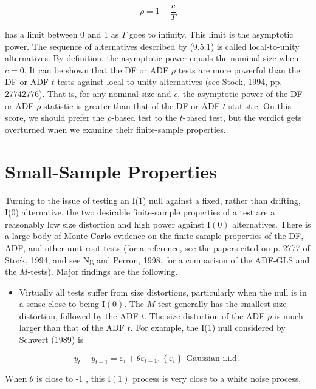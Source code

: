 \documentclass[10pt]{article}
\begin{document}
\begin{equation*}
\rho=1+\frac{c}{T} \tag{9.5.1}
\end{equation*}


has a limit between 0 and 1 as $T$ goes to infinity. This limit is the asymptotic power. The sequence of alternatives described by (9.5.1) is called local-to-unity alternatives. By definition, the asymptotic power equals the nominal size when $c=0$. It can be shown that the DF or ADF $\rho$ tests are more powerful than the DF or ADF $t$ tests against local-to-unity alternatives (see Stock, 1994, pp. 27742776). That is, for any nominal size and $c$, the asymptotic power of the DF or ADF $\rho$ statistic is greater than that of the DF or ADF $t$-statistic. On this score, we should prefer the $\rho$-based test to the $t$-based test, but the verdict gets overturned when we examine their finite-sample properties.

\section*{Small-Sample Properties}
Turning to the issue of testing an I(1) null against a fixed, rather than drifting, I(0) alternative, the two desirable finite-sample properties of a test are a reasonably low size distortion and high power against $\mathrm{I}(0)$ alternatives. There is a large body of Monte Carlo evidence on the finite-sample properties of the DF, ADF, and other unit-root tests (for a reference, see the papers cited on p. 2777 of Stock, 1994, and see Ng and Perron, 1998, for a comparison of the ADF-GLS and the $M$-tests). Major findings are the following.

\begin{itemize}
  \item Virtually all tests suffer from size distortions, particularly when the null is in a sense close to being $\mathrm{I}(0)$. The $M$-test generally has the smallest size distortion, followed by the ADF $t$. The size distortion of the ADF $\rho$ is much larger than that of the ADF $t$. For example, the I(1) null considered by Schwert (1989) is
\end{itemize}


\begin{equation*}
y_{t}-y_{t-1}=\varepsilon_{t}+\theta \varepsilon_{t-1},\left\{\varepsilon_{t}\right\} \text { Gaussian i.i.d. } \tag{9.5.2}
\end{equation*}


When $\theta$ is close to -1 , this $\mathrm{I}(1)$ process is very close to a white noise process,
\end{document}
